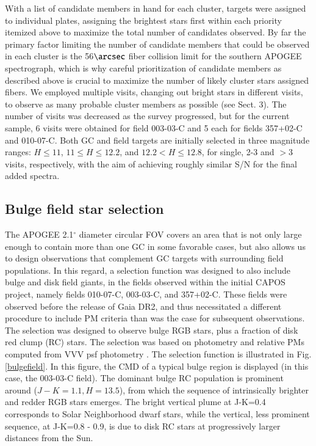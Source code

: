 \documentclass[onecolumn]{aa}
\begin{document}
With a list of candidate members in hand for each cluster, targets were assigned to individual plates, assigning the brightest stars first within each priority itemized above to maximize the total number of candidates observed.
By far the primary factor limiting the number of candidate members that could be observed in each cluster is the 56$\arcsec$ fiber collision limit for the southern APOGEE spectrograph, which is why careful prioritization of candidate members as described above is crucial to maximize the number of likely cluster stars assigned fibers. We employed multiple visits, changing out bright stars in different visits, to observe as many probable cluster members as possible (see Sect. 3). The number of visits was decreased as the survey progressed, but for the current sample, 6 visits were obtained for field 003-03-C and 5 each for fields 357+02-C and 010-07-C.
Both GC and field targets are initially selected in three magnitude ranges: $H\leq11$,
$11\leq H\leq 12.2$, and $12.2< H\leq 12.8$, for single, 2-3 and $>3$ visits, respectively, with the aim of achieving roughly similar S/N for the final added spectra. 

\subsection{Bulge field star selection}
The APOGEE 2.1$^\circ $ diameter circular FOV covers an area that is not only
large enough to contain more than one GC in some favorable
cases, but also allows us to design
observations that complement GC targets with surrounding field populations. In this regard, 
a selection function was designed to also include bulge and disk field giants, in the fields observed within the initial CAPOS
project, namely fields 010-07-C, 003-03-C, and 357+02-C. 
These fields were observed before the release of Gaia DR2, and thus necessitated a different procedure to include PM criteria than was the case for subsequent observations.
The selection was
designed to observe bulge RGB stars, plus a fraction of disk red clump (RC)
stars. The selection was based on photometry and relative PMs computed
from VVV psf photometry \citep{ContrerasRamos2017}. The selection function is
illustrated in Fig.\ref{bulgefield}. In this figure, the CMD of a typical bulge region
is displayed (in this case, the 003-03-C field). The dominant bulge RC population is prominent around ($J-K=1.1, H=13.5$), from which
the sequence of intrinsically brighter and redder RGB stars emerges. The bright 
vertical plume at J-K=0.4 corresponds to Solar Neighborhood dwarf stars,
while the vertical, less prominent sequence, at J-K=0.8 - 0.9, is due to disk RC stars at
progressively larger distances from the Sun.
\end{document}
